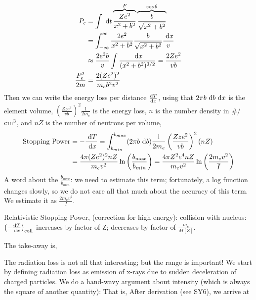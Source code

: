 \documentclass{school-22.101-notes}
\begin{document}
\begin{align}
    P_e &= \int \mbox{ }\mathrm{d} t \overbrace{\frac{Ze^2}{x^2 + b^2}}^{F} \overbrace{\frac{b}{\sqrt{x^2 + b^2}}}^{\cos \theta} \\
    &= \int_{-\infty}^{\infty} \frac{2e^2}{x^2+b^2} \frac{b}{\sqrt{x^2 + b^2}} \frac{\mbox{ }\mathrm{d} x}{v} \\
    &\approx \frac{2e^2 b}{v} \int \frac{\mbox{ }\mathrm{d} x}{(x^2 + b^2)^{3/2}} = \frac{2Ze^2}{vb} \\
    \frac{P_e^2}{2m} &= \frac{2 (Ze^2)^2}{m_e b^2 v^2} 
\end{align}
Then we can write the energy loss per distance $\frac{\mathrm{d}T}{\mathrm{d}x}$, using that $2 \pi b \mbox{ }\mathrm{d} b \mbox{ }\mathrm{d} x$ is the element volume, $\left(\frac{Zze^2}{v b} \right)^2 \frac{1}{2m_e}$ is the energy loss, $n$ is the number density in \#/$\mathrm{cm}^3$, and $nZ$ is the number of neutrons per volume, 
\begin{align}
    \mbox{Stopping Power} &= - \frac{\mbox{ }\mathrm{d} T}{\mbox{ }\mathrm{d} x} = \int_{b_{min}}^{b_{max}} (2 \pi b \mbox{ }\mathrm{d} b) \frac{1}{2m_e} \left( \frac{Zze^2}{vb} \right)^2 (n Z) \\
    &= \frac{4 \pi (Ze^2)^2nZ }{m_e v^2 } \ln \left( \frac{b_{max}}{b_{min}} \right) = \frac{4 \pi Z^2 e^4 n Z}{m_e v^2} \ln \left( \frac{2 m_e v^2}{\left.\overline{I} \right.} \right) 
\end{align}
A word about the $\frac{b_{max}}{b_{min}}$: we need to estimate this term; fortunately, a log function changes slowly, so we do not care all that much about the accuracy of this term. We estimate it as $\frac{2m_e v^2}{I}$. 

Relativistic Stopping Power,  (correction for high energy):
collision with nucleus: $\left( -\frac{\mathrm{d}T}{\mathrm{d}x} \right)_{\mathrm{coll}}$ increases by factor of Z; decreases by factor of $\frac{m_e}{M[Z]}$. 

The take-away is, 


The radiation loss is not all that interesting; but the range is important! We start by defining radiation loss as emission of x-rays due to sudden deceleration of charged particles. We do a hand-wavy argument about intensity (which is always the square of another quantity): 
That is,  
After derivation (see SY6), we arrive at 
\end{document}
